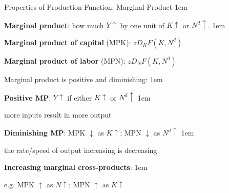\documentclass[11pt,aspectratio=43]{beamer} \usepackage[utf8]{inputenc}
\let\olditemize=\itemize
\let\endolditemize=\enditemize
\renewenvironment{itemize}{\olditemize \itemsep1em}{\endolditemize}
\theoremstyle{definition}
\begin{document}
\begin{frame}{Properties of Production Function: Marginal Product}
\label{slide:Properties_of_Production_Function__Marginal_Product}
\begin{itemize}
    \item  \textbf{Marginal product}: how much $ Y \uparrow $ by one unit of $ K \uparrow  $ or $ N^{d} \uparrow $.
    \begin{itemize}
        \item \textbf{Marginal product of capital} (MPK): $z D_{K}F( K, N^{d} )$
        \item \textbf{Marginal product of labor} (MPN): $z D_{N}F( K, N^{d} )$
    \end{itemize}
    \item Marginal product is \alert{positive} and \alert{diminishing}:
    \begin{itemize}
        \item \textbf{Positive MP}: $ Y \uparrow  $ if either $ K\uparrow  $ or $ N^{d} \uparrow  $
        \begin{itemize}
            \item more inputs result in more output
        \end{itemize}
        \item \textbf{Diminishing MP}: MPK $ \downarrow  $ as $ K \uparrow  $; MPN $ \downarrow  $ as $ N^{d}  \uparrow  $
        \begin{itemize}
            \item the \alert{rate/speed} of output increasing is decreasing
        \end{itemize}
    \end{itemize}
    \item \textbf{Increasing marginal cross-products}:
    \begin{itemize}
        \item e.g. MPK $ \uparrow  $ as $ N \uparrow  $; MPN $ \uparrow  $ as $ K \uparrow  $
    \end{itemize}
\end{itemize}
\end{frame}
\end{document}
